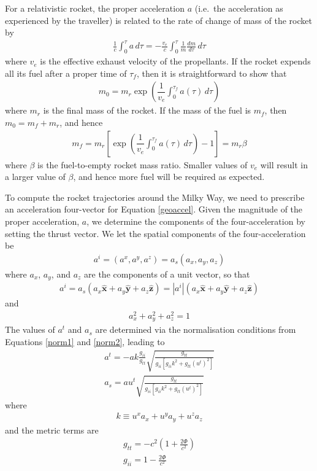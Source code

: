 \documentclass[review]{elsarticle}
\begin{document}
For a relativistic rocket, the proper acceleration $a$ (i.e.~the acceleration as experienced by the traveller) is related to the rate of change of mass of the rocket \cite{Bade1953} by 
\begin{gather}
\frac{1}{c}\int_0^\tau a\,d\tau=-\frac{v_e}{c}\int_0^\tau \frac{1}{m}\frac{dm}{d\tau}\,d\tau
\end{gather}
where $v_e$ is the effective exhaust velocity of the propellants. If the rocket expends all its fuel after a proper time of $\tau_f$, then it is straightforward to show that
\begin{gather}
m_0 = m_r\exp\left(\dfrac{1}{v_e}\int_0^{\tau_f} a(\tau)\,d\tau\right)
\label{rockmass}
\end{gather}
where $m_r$ is the final mass of the rocket. If the mass of the fuel is $m_f$, then $m_0=m_f+m_r$, and hence
\begin{gather}
m_f=m_r\left[\exp\left(\dfrac{1}{v_e}\int_0^{\tau_f} a(\tau)\,d\tau\right)-1\right]=m_r\beta
\label{mfuelreq}
\end{gather}
where $\beta$ is the fuel-to-empty rocket mass ratio. Smaller values of $v_e$ will result in a larger value of $\beta$, and hence more fuel will be required as expected.

To compute the rocket trajectories around the Milky Way, we need to prescribe an acceleration four-vector for Equation \eqref{geoaccel}. Given the magnitude of the proper acceleration, $a$, we determine the components of the four-acceleration by setting the thrust vector. We let the spatial components of the four-acceleration be
\begin{gather}
a^i=(a^x,a^y,a^z)=a_s(a_x,a_y,a_z)
\end{gather}
where $a_x$, $a_y$, and $a_z$ are the components of a unit vector, so that
\begin{gather}
a^i=a_s(a_x\mathbf{\hat{x}}+a_y\mathbf{\hat{y}}+a_z\mathbf{\hat{z}})=|a^i|(a_x\mathbf{\hat{x}}+a_y\mathbf{\hat{y}}+a_z\mathbf{\hat{z}})
\end{gather}
and
\begin{gather}
a_x^2+a_y^2+a_z^2=1
\end{gather}
The values of $a^t$ and $a_s$ are determined via the normalisation conditions from Equations \eqref{norm1} and \eqref{norm2}, leading to 
\begin{gather}
a^t=-ak\frac{g_{ii}}{g_{tt}}\sqrt{\frac{g_{tt}}{g_{ii}[g_{ii}k^2+g_{tt}(u^t)^2]}}\\
a_s = au^t\sqrt{\frac{g_{tt}}{g_{ii}[g_{ii}k^2+g_{tt}(u^t)^2]}}
\end{gather}
where
\begin{gather}
k \equiv u^xa_x+u^ya_y+u^za_z
\end{gather}
and the metric terms are
\begin{gather}
g_{tt}=-c^2\left(1+\frac{2\Phi}{c^2}\right)\\
g_{ii}=1-\frac{2\Phi}{c^2}
\end{gather}
\end{document}
